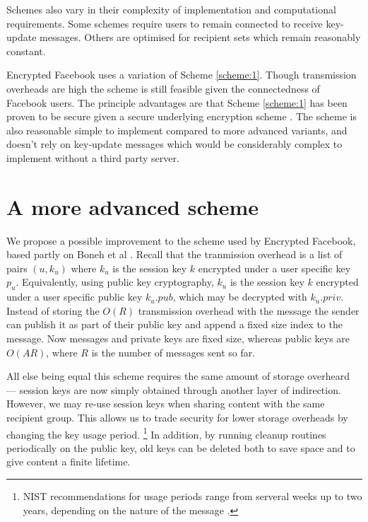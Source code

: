 Schemes also vary in their complexity of implementation and computational requirements. Some schemes require users to remain connected to receive key-update messages. Others are optimised for recipient sets which remain reasonably constant.

Encrypted Facebook uses a variation of Scheme \ref{scheme:1}. Though transmission overheads are high the scheme is still feasible given the connectedness of Facebook users. The principle advantages are that Scheme \ref{scheme:1} has been proven to be secure given a secure underlying encryption scheme \cite{survey}. The scheme is also reasonable simple to implement compared to more advanced variants, and doesn't rely on key-update messages which would be considerably complex to implement without a third party server.

\section{A more advanced scheme}
\label{ssec:bcast-improved}

We propose a possible improvement to the scheme used by Encrypted Facebook, based partly on Boneh et al \cite{boneh}. Recall that the tranmission overhead is a list of pairs $(u, k_u)$ where $k_u$ is the session key $k$ encrypted under a user specific key $p_u$. Equivalently, using public key cryptography, $k_u$ is the session key $k$ encrypted under a user specific public key $k_u.pub$, which may be decrypted with $k_u.priv$. Instead of storing the $O(R)$ transmission overhead with the message the sender can publish it as part of their public key and append a fixed size index to the message. Now messages and private keys are fixed size, whereas public keys are $O(AR)$, where $R$ is the number of messages sent so far. 

All else being equal this scheme requires the same amount of storage overheard --- session keys are now simply obtained through another layer of indirection. However, we may re-use session keys when sharing content with the same recipient group. This allows us to trade security for lower storage overheads by changing the key usage period. \footnote{NIST recommendations for usage periods range from serveral weeks up to two years, depending on the nature of the message \cite{nist-key}.} In addition, by running cleanup routines periodically on the public key, old keys can be deleted both to save space and to give content a finite lifetime.